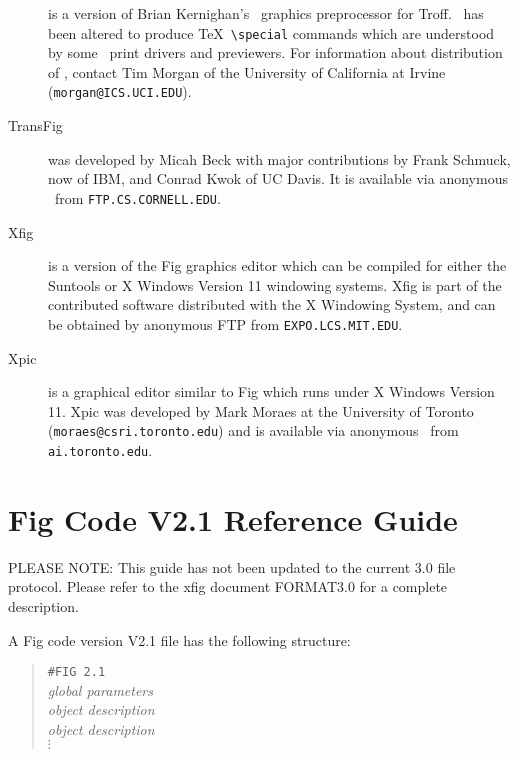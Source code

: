 \begin{description}
\item[\tpic]
	is a version of Brian Kernighan's \PIC\ graphics preprocessor
	for Troff.
\tpic\ has been altered to produce \TeX\ {\verb|\special|} commands which
	are understood by some \DVI\ print drivers and previewers.
For information about distribution of \tpic, contact Tim Morgan of
	the University of California at Irvine ({\tt morgan@ICS.UCI.EDU}).

\item[TransFig]
	was developed by Micah Beck with major contributions
	by Frank Schmuck, now of IBM, and Conrad Kwok of UC Davis.
	It is available via anonymous \FTP\ from {\tt FTP.CS.CORNELL.EDU}.

\item[Xfig]
	is a version of the Fig graphics editor which can be compiled for
	either the Suntools or X Windows Version 11 windowing systems.
Xfig is part of the contributed software distributed with the X Windowing
	System, and can be obtained by anonymous FTP from
	{\tt EXPO.LCS.MIT.EDU}.

\item[Xpic]
	is a graphical editor similar to Fig which runs under X Windows
	Version 11.
Xpic was developed by Mark Moraes at the University of Toronto
	({\tt moraes@csri.toronto.edu}) and is available via anonymous
	\FTP\ from {\tt ai.toronto.edu}.

\end{description}

\raggedbottom
\pagebreak

\appendix

\section{Fig Code V2.1 Reference Guide}
\label{s:guide}

PLEASE NOTE:  This guide has not been updated to the current 3.0 file
protocol.  Please refer to the xfig document FORMAT3.0 for a complete
description.

A Fig code version V2.1 file has the following structure:
%
\begin{quote}
\begin{tabbing}
\verb|#FIG 2.1|			\\
\it global parameters		\\
\it object description		\\
\it object \= \it description	\\
\> $\vdots$
\end{tabbing}
\end{quote}
%
